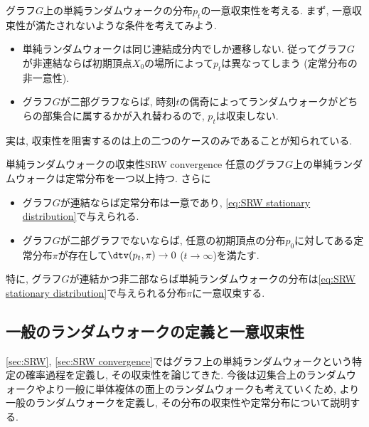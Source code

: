 グラフ$G$上の単純ランダムウォークの分布$p_t$の一意収束性を考える.
まず, 一意収束性が満たされないような条件を考えてみよう.
\begin{itemize}
  \item 単純ランダムウォークは同じ連結成分内でしか遷移しない. 従ってグラフ$G$が非連結ならば初期頂点$X_0$の場所によって$p_t$は異なってしまう (定常分布の非一意性).
  \item グラフ$G$が二部グラフならば, 時刻$t$の偶奇によってランダムウォークがどちらの部集合に属するかが入れ替わるので, $p_t$は収束しない.
\end{itemize}
%
実は, 収束性を阻害するのは上の二つのケースのみであることが知られている.
%
\begin{theorem}{単純ランダムウォークの収束性}{SRW convergence}
  任意のグラフ$G$上の単純ランダムウォークは定常分布を一つ以上持つ.
  さらに
  \begin{itemize}
    \item グラフ$G$が連結ならば定常分布は一意であり, \cref{eq:SRW stationary distribution}で与えられる.
    \item グラフ$G$が二部グラフでないならば, 任意の初期頂点の分布$p_0$に対してある定常分布$\pi$が存在して$\dtv(p_t,\pi)\to 0$ ($t\to\infty$)を満たす.
  \end{itemize}

  特に, グラフ$G$が連結かつ非二部ならば単純ランダムウォークの分布は\cref{eq:SRW stationary distribution}で与えられる分布$\pi$に一意収束する.
\end{theorem}


\subsection{一般のランダムウォークの定義と一意収束性} \label{sec:Markov chain}
  \cref{sec:SRW}, \ref{sec:SRW convergence}ではグラフ上の単純ランダムウォークという特定の確率過程を定義し, その収束性を論じてきた.
  今後は辺集合上のランダムウォークやより一般に単体複体の面上のランダムウォークも考えていくため,
  より一般のランダムウォークを定義し, その分布の収束性や定常分布について説明する.

